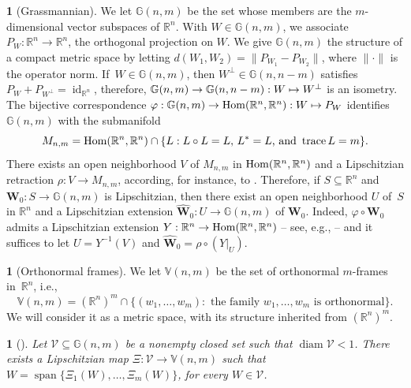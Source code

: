 \documentclass[11pt]{article}
\newcommand{\ie}{i.e.,\xspace}
\newcounter{cdrthm}[section]
\theoremstyle{definition}
\theoremstyle{jepanonymous}
\newtheorem{jepempty}[cdrthm]{}
\newenvironment{enonce}[2][remark]{\begin{jepempty}[#2]}{\end{jepempty}}
\theoremstyle{plain}
\newcommand\mto{\mathchoice{\longmapsto}{\mapsto}{\mapsto}{\mapsto}}
\newenvironment{Empty}[2][\null]{%
\begin{enonce}[remark]{#1}#2}
{\end{enonce}}
\newcommand{\R}{\mathbb{R}}
\newcommand{\Rn}{\R^n}
\newcommand{\calV}{\mathscr{V}}
\newcommand{\bW}{{\boldsymbol{W}}}
\newcommand{\bV}{\mathbb{V}}
\newcommand{\bG}{\mathbb{G}}
\let\bY Y
\DeclareMathOperator{\rmdiam}{\mathrm{diam}}
\DeclareMathOperator{\rmid}{\mathrm{id}}
\DeclareMathOperator{\rmspan}{\mathrm{span}}
\DeclareMathOperator{\rmtrace}{\mathrm{trace}}
\let\vphi\varphi
\let\wh\widehat
\let\subset\subseteq
\begin{document}
\begin{Empty}[Grassmannian]
\label{grassmann}
We let $\bG(n,m)$ be the set whose members are the $m$-dimensional vector subspaces of $\Rn$.
With $W \in \bG(n,m)$, we associate $P_W: \Rn \to \Rn$, the orthogonal projection on $W$.
We give $\bG(n,m)$ the structure of a compact metric space by letting $d(W_1,W_2) = \|P_{W_1}-P_{W_2}\|$, where $\|\cdot\|$ is the operator norm.
If~$W \in \bG(n,m)$, then $W^\perp \in \bG(n,n-m)$ satisfies $P_W + P_{W^\perp}=\rmid_{\Rn}$, therefore, $\bG(n,m) \to \bG(n,n-m): W \mto W^\perp$ is an isometry.
The bijective correspondence $\vphi:\bG(n,m) \to \rmHom(\Rn,\Rn): W \mto P_W$ identifies $\bG(n,m)$ with the submanifold
\[
M_{n,m} = \rmHom(\Rn,\Rn) \cap \{ L: L \circ L = L,\, L^*=L \text{, and } \rmtrace L = m \}.
\]
There exists an open neighborhood $V$ of $M_{n,m}$ in $\rmHom(\Rn,\Rn)$ and a Lipschitzian retraction $\rho: V \to M_{n,m}$, according, for instance, to \cite[3.1.20]{GMT}.
Therefore, if $S \subset \Rn$ and $\bW_0: S \to \bG(n,m)$ is Lipschitzian, then there exist an open neighborhood $U$ of~$S$ in $\Rn$ and a Lipschitzian extension $\wh{\bW}_0: U \to \bG(n,m)$ of $\bW_0$.
Indeed, $\vphi \circ \bW_0$ admits a Lipschitzian extension $\bY: \Rn \to \rmHom(\Rn,\Rn)$ -- see, e.g., \cite[2.10.43]{GMT} -- and it suffices to let $U = \bY^{-1}(V)$ and $\wh{\bW}_0 = \rho \circ \left(\bY |_U \right)$.
\end{Empty}

\begin{Empty}[Orthonormal frames]
\label{stiefel}
We let $\bV(n,m)$ be the set of orthonormal $m$-frames in~$\Rn$, \ie
\[
\bV(n,m) = (\Rn)^{m} \cap\{ (w_1,\ldots,w_{m}): \text{ the family } w_1,\ldots,w_{m} \text{ is orthonormal}\}.
\]
We will consider it as a metric space, with its structure inherited from $(\Rn)^{m}$.
\end{Empty}

\begin{Empty}[]
\label{grass.param.stief}
{\it
Let $\calV \subset \bG(n,m)$ be a nonempty closed set such that $\rmdiam \calV < 1$. There exists a Lipschitzian map $\Xi: \calV \to \bV(n,m)$ such that $W = \rmspan \{ \Xi_1(W),\ldots,\Xi_m(W)\}$, for every $W \in \calV$.
}
\end{Empty}
\end{document}
